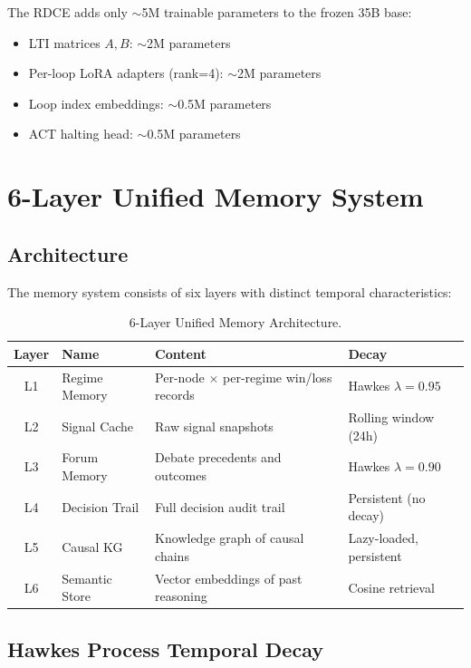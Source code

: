 \documentclass[11pt, a4paper]{article}
\begin{document}
The RDCE adds only $\sim$5M trainable parameters to the frozen 35B base:
\begin{itemize}
  \item LTI matrices $A, B$: $\sim$2M parameters
  \item Per-loop LoRA adapters (rank=4): $\sim$2M parameters
  \item Loop index embeddings: $\sim$0.5M parameters
  \item ACT halting head: $\sim$0.5M parameters
\end{itemize}


\section{6-Layer Unified Memory System}
\label{sec:memory}

\subsection{Architecture}

The memory system consists of six layers with distinct temporal characteristics:

\begin{table}[H]
\centering
\begin{tabular}{clll}
\toprule
\textbf{Layer} & \textbf{Name} & \textbf{Content} & \textbf{Decay} \\
\midrule
L1 & Regime Memory & Per-node $\times$ per-regime win/loss records & Hawkes $\lambda=0.95$ \\
L2 & Signal Cache & Raw signal snapshots & Rolling window (24h) \\
L3 & Forum Memory & Debate precedents and outcomes & Hawkes $\lambda=0.90$ \\
L4 & Decision Trail & Full decision audit trail & Persistent (no decay) \\
L5 & Causal KG & Knowledge graph of causal chains & Lazy-loaded, persistent \\
L6 & Semantic Store & Vector embeddings of past reasoning & Cosine retrieval \\
\bottomrule
\end{tabular}
\caption{6-Layer Unified Memory Architecture.}
\label{tab:memory}
\end{table}

\subsection{Hawkes Process Temporal Decay}
\end{document}
